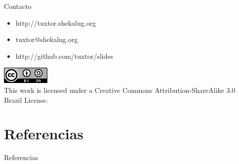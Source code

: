 \documentclass{beamer}
\begin{document}
\begin{frame}{Contacto}
\begin{itemize}
\item http://tuxtor.shekalug.org
\item tuxtor@shekalug.org
\item http://github.com/tuxtor/slides
\end{itemize}
\begin{center}
\includegraphics[width=0.1\linewidth]{Figures/cclogo}
\\
This work is licensed under a Creative Commons Attribution-ShareAlike 3.0 Brazil License.
\end{center}
\end{frame}

\section{Referencias}
\begin{frame}[allowframebreaks]{Referencias}
    
    
\end{frame}
\end{document}
